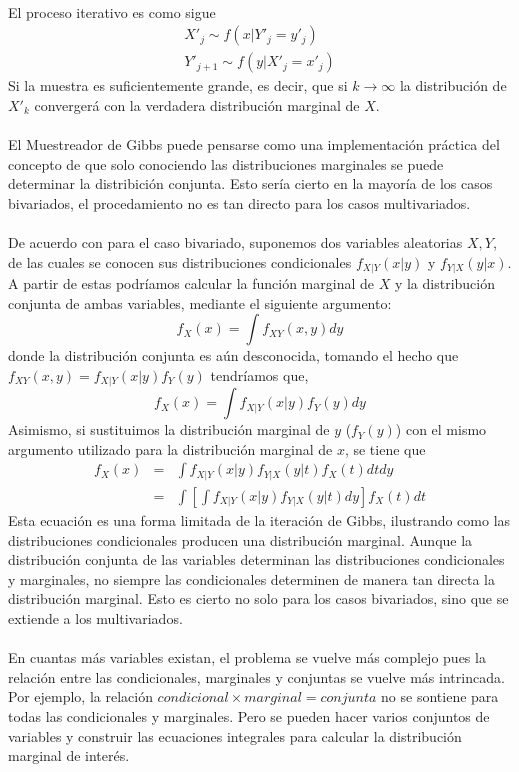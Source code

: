 \\El proceso iterativo es como sigue\\
\begin{align*}
X'_j \sim f(x|Y'_j=y'_j)\\
Y'_{j+1} \sim f(y|X'_j=x'_j)
\end{align*}
Si la muestra es suficientemente grande, es decir, que si $k \rightarrow \infty$ la distribuci\'on de $X'_k$ converger\'a con la verdadera distribuci\'on marginal de $X$.\\
\\
El Muestreador de Gibbs puede pensarse como una implementaci\'on pr\'actica del concepto de que solo conociendo las distribuciones marginales se puede determinar la distribici\'on conjunta. Esto ser\'ia cierto en la mayor\'ia de los casos bivariados, el procedamiento no es tan directo para los casos multivariados.\\
\\
De acuerdo con \cite{casella1992explaining} para el caso bivariado, suponemos dos variables aleatorias $X,Y$, de las cuales se conocen sus distribuciones condicionales $f_{X|Y}(x|y)$ y $f_{Y|X}(y|x)$. A partir de estas podr\'iamos calcular la funci\'on marginal de $X$ y la distribuci\'on conjunta de ambas variables, mediante  el siguiente argumento:\\
\[f_X(x)=\int f_{XY}(x,y)dy\]
donde la distribuci\'on conjunta es a\'un desconocida, tomando el hecho que $f_{XY}(x,y)=f_{X|Y}(x|y)f_Y(y)$ tendr\'iamos que,\\
\[f_X(x)=\int f_{X|Y}(x|y)f_Y(y) dy\]
Asimismo, si sustituimos la distribuci\'on marginal de $y$ ($f_Y(y)$) con el mismo argumento utilizado para la distribuci\'on marginal de $x$, se tiene que
\begin{eqnarray*}
f_X(x) &=& \int f_{X|Y}(x|y) f_{Y|X}(y|t) f_X(t)dt dy\\
       &=& \int [ \int  f_{X|Y}(x|y)f_{Y|X}(y|t) dy]  f_X(t) dt
\end{eqnarray*}
Esta ecuaci\'on es una forma limitada de la iteraci\'on de Gibbs, ilustrando como las distribuciones condicionales producen una distribuci\'on marginal. Aunque la distribuci\'on conjunta de las variables determinan las distribuciones condicionales y marginales, no siempre las condicionales determinen de manera tan directa la distribuci\'on marginal. Esto es cierto no solo para los casos bivariados, sino que se extiende a los multivariados.\\
\\
En cuantas m\'as variables existan, el problema se vuelve m\'as complejo pues la relaci\'on entre las condicionales, marginales y conjuntas se vuelve m\'as intrincada. Por ejemplo, la relaci\'on $condicional \times marginal = conjunta$ no se sontiene para todas las condicionales y marginales. Pero se pueden hacer varios conjuntos de variables y construir las ecuaciones integrales para calcular la distribuci\'on marginal de inter\'es.\\
